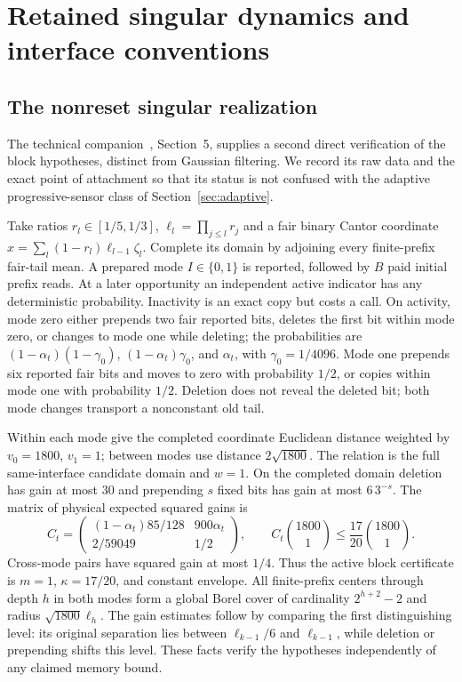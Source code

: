\section{Retained singular dynamics and interface conventions}\label{sec:appendix}
\subsection{The nonreset singular realization}
The technical companion~\cite{companion}, Section~5, supplies a second direct verification of the block hypotheses, distinct from Gaussian filtering. We record its raw data and the exact point of attachment so that its status is not confused with the adaptive progressive-sensor class of Section~\ref{sec:adaptive}.

Take ratios $r_l\in[1/5,1/3]$, $\ell_l=\prod_{j\le l}r_j$ and a fair binary Cantor coordinate $x=\sum_l(1-r_l)\ell_{l-1}\zeta_l$. Complete its domain by adjoining every finite-prefix fair-tail mean. A prepared mode $I\in\{0,1\}$ is reported, followed by $B$ paid initial prefix reads. At a later opportunity an independent active indicator has any deterministic probability. Inactivity is an exact copy but costs a call. On activity, mode zero either prepends two fair reported bits, deletes the first bit within mode zero, or changes to mode one while deleting; the probabilities are $(1-\alpha_t)(1-\gamma_0)$, $(1-\alpha_t)\gamma_0$, and $\alpha_t$, with $\gamma_0=1/4096$. Mode one prepends six reported fair bits and moves to zero with probability $1/2$, or copies within mode one with probability $1/2$. Deletion does not reveal the deleted bit; both mode changes transport a nonconstant old tail.

Within each mode give the completed coordinate Euclidean distance weighted by $v_0=1800$, $v_1=1$; between modes use distance $2\sqrt{1800}$. The relation is the full same-interface candidate domain and $w=1$. On the completed domain deletion has gain at most $30$ and prepending $s$ fixed bits has gain at most $6\,3^{-s}$. The matrix of physical expected squared gains is
\[
 C_t=\begin{pmatrix}(1-\alpha_t)85/128&900\alpha_t\\2/59049&1/2\end{pmatrix},
 \qquad C_t\binom{1800}{1}\le\frac{17}{20}\binom{1800}{1}.
\]
Cross-mode pairs have squared gain at most $1/4$. Thus the active block certificate is $m=1$, $\kappa=17/20$, and constant envelope. All finite-prefix centers through depth $h$ in both modes form a global Borel cover of cardinality $2^{h+2}-2$ and radius $\sqrt{1800}\ell_h$. The gain estimates follow by comparing the first distinguishing level: its original separation lies between $\ell_{k-1}/6$ and $\ell_{k-1}$, while deletion or prepending shifts this level. These facts verify the hypotheses independently of any claimed memory bound.

